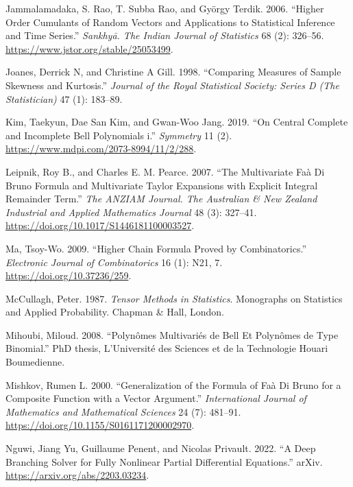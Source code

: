 \begin{CSLReferences}{1}{0}
\leavevmode{}%
Jammalamadaka, S. Rao, T. Subba Rao, and György Terdik. 2006. {``Higher Order Cumulants of Random Vectors and Applications to Statistical Inference and Time Series.''} \emph{Sankhyā. The Indian Journal of Statistics} 68 (2): 326--56. \url{https://www.jstor.org/stable/25053499}.

\leavevmode{}%
Joanes, Derrick N, and Christine A Gill. 1998. {``Comparing Measures of Sample Skewness and Kurtosis.''} \emph{Journal of the Royal Statistical Society: Series D (The Statistician)} 47 (1): 183--89.

\leavevmode{}%
Kim, Taekyun, Dae San Kim, and Gwan-Woo Jang. 2019. {``On Central Complete and Incomplete Bell Polynomials i.''} \emph{Symmetry} 11 (2). \url{https://www.mdpi.com/2073-8994/11/2/288}.

\leavevmode{}%
Leipnik, Roy B., and Charles E. M. Pearce. 2007. {``The Multivariate {F}aà Di {B}runo Formula and Multivariate {T}aylor Expansions with Explicit Integral Remainder Term.''} \emph{The ANZIAM Journal. The Australian \& New Zealand Industrial and Applied Mathematics Journal} 48 (3): 327--41. \url{https://doi.org/10.1017/S1446181100003527}.

\leavevmode{}%
Ma, Tsoy-Wo. 2009. {``Higher Chain Formula Proved by Combinatorics.''} \emph{Electronic Journal of Combinatorics} 16 (1): N21, 7. \url{https://doi.org/10.37236/259}.

\leavevmode{}%
McCullagh, Peter. 1987. \emph{Tensor Methods in Statistics}. Monographs on Statistics and Applied Probability. Chapman \& Hall, London.

\leavevmode{}%
Mihoubi, Miloud. 2008. {``Polynômes Multivariés de Bell Et Polynômes de Type Binomial.''} PhD thesis, L'Université des Sciences et de la Technologie Houari Boumedienne.

\leavevmode{}%
Mishkov, Rumen L. 2000. {``Generalization of the Formula of {F}aà Di {B}runo for a Composite Function with a Vector Argument.''} \emph{International Journal of Mathematics and Mathematical Sciences} 24 (7): 481--91. \url{https://doi.org/10.1155/S0161171200002970}.

\leavevmode{}%
Nguwi, Jiang Yu, Guillaume Penent, and Nicolas Privault. 2022. {``A Deep Branching Solver for Fully Nonlinear Partial Differential Equations.''} arXiv. \url{https://arxiv.org/abs/2203.03234}.


\end{CSLReferences}
